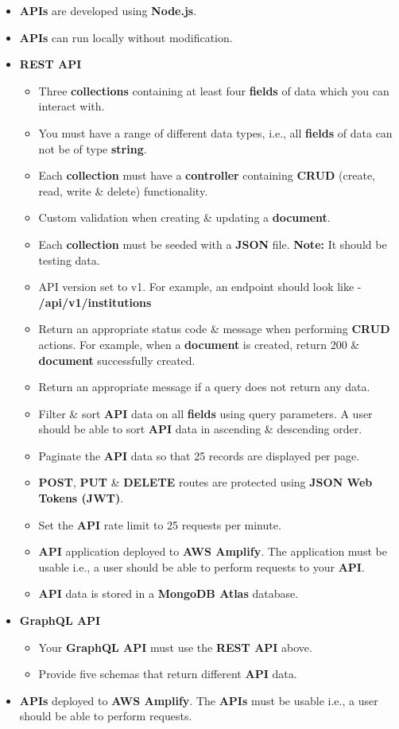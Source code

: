 \documentclass{article}
\begin{document}
\begin{itemize}
    \item \textbf{APIs} are developed using \textbf{Node.js}.
    \item \textbf{APIs} can run locally without modification.
    \item \textbf{REST API}
    \begin{itemize}
      \item Three \textbf{collections} containing at least four \textbf{fields} of data which you can interact with.  
      \item You must have a range of different data types, i.e., all \textbf{fields} of data can not be of type \textbf{string}.
      \item Each \textbf{collection} must have a \textbf{controller} containing \textbf{CRUD} (create, read, write \& delete) functionality. 
      \item Custom validation when creating \& updating a \textbf{document}.
      \item Each \textbf{collection} must be seeded with a \textbf{JSON} file. \textbf{Note:} It should be testing data.
      \item API version set to v1. For example, an endpoint should look like - \textbf{/api/v1/institutions}
      \item Return an appropriate status code \& message when performing \textbf{CRUD} actions. For example, when a \textbf{document} is created, return 200 \& \textbf{document} successfully created. 
      \item Return an appropriate message if a query does not return any data.
      \item Filter \& sort \textbf{API} data on all \textbf{fields} using query parameters. A user should be able to sort \textbf{API} data in ascending \& descending order.
      \item Paginate the \textbf{API} data so that 25 records are displayed per page.
      \item \textbf{POST}, \textbf{PUT} \& \textbf{DELETE} routes are protected using \textbf{JSON Web Tokens (JWT)}.
      \item Set the \textbf{API} rate limit to 25 requests per minute.
      \item \textbf{API} application deployed to \textbf{AWS Amplify}. The application must be usable i.e., a user should be able to perform requests to your \textbf{API}.
      \item \textbf{API} data is stored in a \textbf{MongoDB Atlas} database.
    \end{itemize}
    \item \textbf{GraphQL API}
    \begin{itemize}
      \item Your \textbf{GraphQL API} must use the \textbf{REST API} above.
      \item Provide five schemas that return different \textbf{API} data.
    \end{itemize}
    \item \textbf{APIs} deployed to \textbf{AWS Amplify}. The \textbf{APIs} must be usable i.e., a user should be able to perform requests.
\end{itemize}
\end{document}
